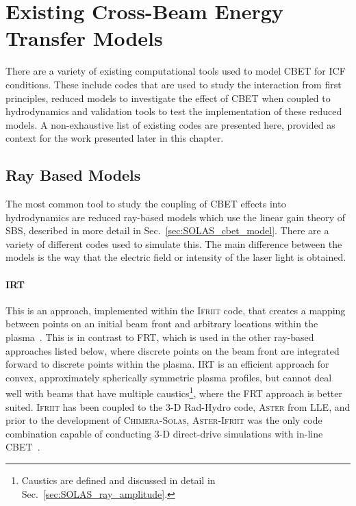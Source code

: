 \section{Existing Cross-Beam Energy Transfer Models}

There are a variety of existing computational tools used to model \ac{CBET} for \ac{ICF} conditions.
These include codes that are used to study the interaction from first principles, reduced models to investigate the effect of \ac{CBET} when coupled to hydrodynamics and validation tools to test the implementation of these reduced models.
A non-exhaustive list of existing codes are presented here, provided as context for the work presented later in this chapter.

\subsection{Ray Based Models}

The most common tool to study the coupling of \ac{CBET} effects into hydrodynamics are reduced ray-based models which use the linear gain theory of \ac{SBS}, described in more detail in Sec.~\ref{sec:SOLAS_cbet_model}.
There are a variety of different codes used to simulate this.
The main difference between the models is the way that the electric field or intensity of the laser light is obtained.

\paragraph*{\ac{IRT}} This is an approach, implemented within the \textsc{Ifriit} code, that creates a mapping between points on an initial beam front and arbitrary locations within the plasma~\cite{colaitis_real_2019,colaitis_adaptive_2019}.
This is in contrast to \ac{FRT}, which is used in the other ray-based approaches listed below, where discrete points on the beam front are integrated forward to discrete points within the plasma.
\ac{IRT} is an efficient approach for convex, approximately spherically symmetric plasma profiles, but cannot deal well with beams that have multiple caustics\footnote{Caustics are defined and discussed in detail in Sec.~\ref{sec:SOLAS_ray_amplitude}.}, where the \ac{FRT} approach is better suited.
\textsc{Ifriit} has been coupled to the 3-D \ac{Rad-Hydro} code, \textsc{Aster} from \ac{LLE}, and prior to the development of \textsc{Chimera}-\textsc{Solas}, \textsc{Aster}-\textsc{Ifriit} was the only code combination capable of conducting 3-D direct-drive simulations with in-line \ac{CBET}~\cite{colaitis_inverse_2021}.

